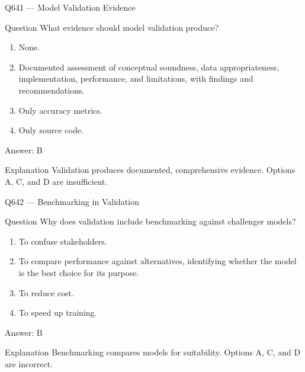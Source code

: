 \documentclass[aspectratio=169,8pt]{beamer}
\begin{document}
	\begin{frame}{Q641 --- Model Validation Evidence}
		\begin{block}{Question}
			What evidence should model validation produce?
			\begin{enumerate}
				\item None.
				\item Documented assessment of conceptual soundness, data appropriateness, implementation, performance, and limitations, with findings and recommendations.
				\item Only accuracy metrics.
				\item Only source code.
			\end{enumerate}
		\end{block}
		\begin{exampleblock}{Answer: B}\end{exampleblock}
		\begin{block}{Explanation}
			Validation produces documented, comprehensive evidence. Options A, C, and D are insufficient.
		\end{block}
	\end{frame}
	
	\begin{frame}{Q642 --- Benchmarking in Validation}
		\begin{block}{Question}
			Why does validation include benchmarking against challenger models?
			\begin{enumerate}
				\item To confuse stakeholders.
				\item To compare performance against alternatives, identifying whether the model is the best choice for its purpose.
				\item To reduce cost.
				\item To speed up training.
			\end{enumerate}
		\end{block}
		\begin{exampleblock}{Answer: B}\end{exampleblock}
		\begin{block}{Explanation}
			Benchmarking compares models for suitability. Options A, C, and D are incorrect.
		\end{block}
	\end{frame}
	
\end{document}
